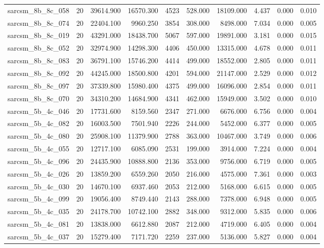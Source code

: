\begin{tabular}{lrrrrrrrrr}
sarcsm\_8b\_8c\_058 & 20 & 39614.900 & 16570.300 & 4523 & 528.000 & 18109.000 & 4.437 & 0.000 & 0.010 \\
sarcsm\_8b\_8c\_074 & 20 & 22404.100 & 9960.250 & 3854 & 308.000 & 8498.000 & 7.034 & 0.000 & 0.005 \\
sarcsm\_8b\_8c\_019 & 20 & 43291.000 & 18438.700 & 5067 & 597.000 & 19891.000 & 3.181 & 0.000 & 0.015 \\
sarcsm\_8b\_8c\_052 & 20 & 32974.900 & 14298.300 & 4406 & 450.000 & 13315.000 & 4.678 & 0.000 & 0.011 \\
sarcsm\_8b\_8c\_083 & 20 & 36791.100 & 15746.200 & 4414 & 499.000 & 18552.000 & 2.805 & 0.000 & 0.011 \\
sarcsm\_8b\_8c\_092 & 20 & 44245.000 & 18500.800 & 4201 & 594.000 & 21147.000 & 2.529 & 0.000 & 0.012 \\
sarcsm\_8b\_8c\_097 & 20 & 37339.800 & 15980.400 & 4375 & 499.000 & 16096.000 & 2.854 & 0.000 & 0.011 \\
sarcsm\_8b\_8c\_070 & 20 & 34310.200 & 14684.900 & 4341 & 462.000 & 15949.000 & 3.502 & 0.000 & 0.010 \\
sarcsm\_5b\_4c\_046 & 20 & 17731.600 & 8159.560 & 2347 & 271.000 & 6676.000 & 6.756 & 0.000 & 0.004 \\
sarcsm\_5b\_4c\_082 & 20 & 16003.500 & 7501.940 & 2226 & 244.000 & 5452.000 & 6.377 & 0.000 & 0.005 \\
sarcsm\_5b\_4c\_080 & 20 & 25908.100 & 11379.900 & 2788 & 363.000 & 10467.000 & 3.749 & 0.000 & 0.006 \\
sarcsm\_5b\_4c\_055 & 20 & 12717.100 & 6085.090 & 2531 & 199.000 & 3914.000 & 7.224 & 0.000 & 0.004 \\
sarcsm\_5b\_4c\_096 & 20 & 24435.900 & 10888.800 & 2136 & 353.000 & 9756.000 & 6.719 & 0.000 & 0.005 \\
sarcsm\_5b\_4c\_026 & 20 & 13859.200 & 6559.260 & 2050 & 216.000 & 4575.000 & 7.361 & 0.000 & 0.003 \\
sarcsm\_5b\_4c\_030 & 20 & 14670.100 & 6937.460 & 2053 & 212.000 & 5168.000 & 6.615 & 0.000 & 0.005 \\
sarcsm\_5b\_4c\_099 & 20 & 19056.400 & 8749.440 & 2143 & 288.000 & 7378.000 & 6.948 & 0.000 & 0.005 \\
sarcsm\_5b\_4c\_035 & 20 & 24178.700 & 10742.100 & 2882 & 348.000 & 9312.000 & 5.835 & 0.000 & 0.006 \\
sarcsm\_5b\_4c\_081 & 20 & 13838.000 & 6612.880 & 2087 & 212.000 & 4719.000 & 6.405 & 0.000 & 0.004 \\
sarcsm\_5b\_4c\_037 & 20 & 15279.400 & 7171.720 & 2259 & 237.000 & 5136.000 & 5.827 & 0.000 & 0.004 \\

\end{tabular}
